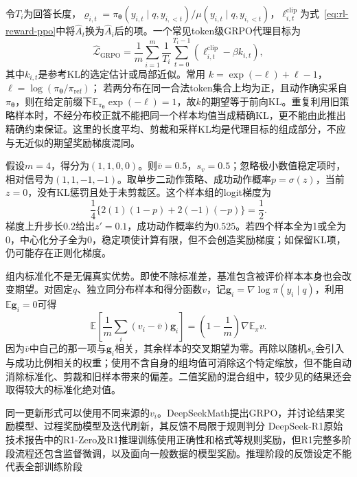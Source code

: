 令$T_i$为回答长度，$\varrho_{i,t}=\pi_{\bm{\theta}}(y_{i,t}\mid q,y_{i,<t})/
\mu(y_{i,t}\mid q,y_{i,<t})$，$\ell_{i,t}^{\mathrm{clip}}$为式~\eqref{eq:rl-reward-ppo}中将$\widehat A_t$换为$\widehat A_i$后的项。一个常见token级GRPO代理目标为
\begin{equation}
  \widehat{\mathcal L}_{\mathrm{GRPO}}
  =\frac1m\sum_{i=1}^m\frac1{T_i}
      \sum_{t=0}^{T_i-1}
       \left(\ell_{i,t}^{\mathrm{clip}}-\beta k_{i,t}\right),
  \label{eq:rl-reward-grpo}
\end{equation}
其中$k_{i,t}$是参考KL的选定估计或局部近似。常用
$k=\exp(-\ell)+\ell-1$，$\ell=\log(\pi_{\bm{\theta}}/\pi_{\mathrm{ref}})$；
若两分布在同一合法token集合上均为正，且动作确实采自$\pi_{\bm{\theta}}$，则在给定前缀下$\mathbb E_{\pi_{\bm{\theta}}}\exp(-\ell)=1$，故$k$的期望等于前向KL。重复利用旧策略样本时，不经分布校正就不能把同一个样本均值当成精确KL，更不能由此推出精确约束保证。这里的长度平均、剪裁和采样KL均是代理目标的组成部分，不应与无近似的期望奖励梯度混同。

\begin{example}[一组验证得分的更新信号]
  \label{ex:rl-reward-grpo}
  假设$m=4$，得分为$(1,1,0,0)$。则$\bar v=0.5$，$s_v=0.5$；忽略极小数值稳定项时，相对信号为$(1,1,-1,-1)$。取单步二动作策略、成功动作概率$p=\sigma(z)$，当前$z=0$，没有KL惩罚且处于未剪裁区。这个样本组的logit梯度为
  \[
    \frac14\{2(1)(1-p)+2(-1)(-p)\}=\frac12.
  \]
  梯度上升步长$0.2$给出$z'=0.1$，成功动作概率约为$0.525$。若四个样本全为1或全为0，中心化分子全为0，稳定项使计算有限，但不会创造奖励梯度；如保留KL项，仍可能存在正则化梯度。
\end{example}

组内标准化不是无偏真实优势。即使不除标准差，基准包含被评价样本本身也会改变期望。对固定$q$、独立同分布样本和得分函数$v$，记$\bm g_i=\nabla\log\pi(y_i\mid q)$，利用$\mathbb E\bm g_i=0$可得
\[
  \mathbb E\left[\frac1m\sum_i(v_i-\bar v)\bm g_i\right]
  =\left(1-\frac1m\right)\nabla\mathbb E_\pi v.
\]
因为$\bar v$中自己的那一项与$\bm g_i$相关，其余样本的交叉期望为零。再除以随机$s_v$会引入与成功比例相关的权重；使用不含自身的组均值可消除这个特定缩放，但不能自动消除标准化、剪裁和旧样本带来的偏差。二值奖励的混合组中，较少见的结果还会取得较大的标准化绝对值。

同一更新形式可以使用不同来源的$v_i$。DeepSeekMath提出GRPO，并讨论结果奖励模型、过程奖励模型及迭代刷新，其反馈不局限于规则判分
DeepSeek-R1原始技术报告中的R1-Zero及R1推理训练使用正确性和格式等规则奖励，但R1完整多阶段流程还包含监督微调，以及面向一般数据的模型奖励。推理阶段的反馈设定不能代表全部训练阶段


